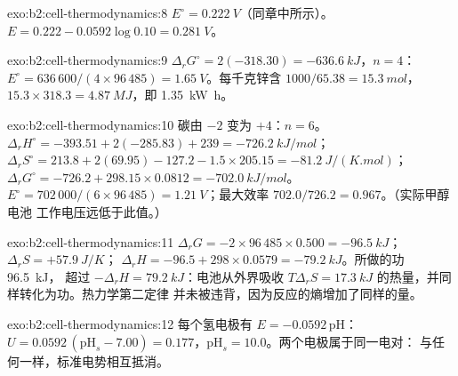 \begin{solution}{exo:b2:cell-thermodynamics:8}
$E^\circ = \qty{0.222}{V}$（同章中所示）。$E = 0.222 - 0.0592\log 0.10 =
\qty{0.281}{V}$。
\end{solution}

\begin{solution}{exo:b2:cell-thermodynamics:9}
$\Delta_r G^\circ = 2(-318.30) = \qty{-636.6}{kJ}$，$n = 4$：$E^\circ =
636\,600/(4 \times 96\,485) = \qty{1.65}{V}$。每千克锌含 $1000/65.38 =
\qty{15.3}{mol}$，$15.3 \times 318.3 = \qty{4.87}{MJ}$，即 \qty{1.35}{kW.h}。
\end{solution}

\begin{solution}{exo:b2:cell-thermodynamics:10}
碳由 $-2$ 变为 $+4$：$n = 6$。$\Delta_r H^\circ = -393.51 + 2(-285.83) +
239 = \qty{-726.2}{kJ/mol}$；$\Delta_r S^\circ = 213.8 + 2(69.95) - 127.2 - 1.5
\times 205.15 = \qty{-81.2}{J/(K.mol)}$；$\Delta_r G^\circ = -726.2 + 298.15 \times
0.0812 = \qty{-702.0}{kJ/mol}$。$E^\circ = 702\,000/(6 \times 96\,485) =
\qty{1.21}{V}$；最大效率 $702.0/726.2 = 0.967$。（实际甲醇电池
工作电压远低于此值。）
\end{solution}

\begin{solution}{exo:b2:cell-thermodynamics:11}
$\Delta_r G = -2 \times 96\,485 \times 0.500 = \qty{-96.5}{kJ}$；$\Delta_r S = +\qty{57.9}{J/K}$；
$\Delta_r H = -96.5 + 298 \times 0.0579 = \qty{-79.2}{kJ}$。所做的功 \qty{96.5}{kJ}，
超过 $-\Delta_r H = \qty{79.2}{kJ}$：电池从外界吸收 $T\Delta_r S = \qty{17.3}{kJ}$
的热量，并同样转化为功。热力学第二定律
并未被违背，因为反应的熵增加了同样的量。
\end{solution}

\begin{solution}{exo:b2:cell-thermodynamics:12}
每个氢电极有 $E = -0.0592\,\mathrm{pH}$：$U = 0.0592\,(\mathrm{pH}_s -
7.00) = 0.177$，$\mathrm{pH}_s = 10.0$。两个电极属于同一电对：
与任何一样，标准电势相互抵消。
\end{solution}

